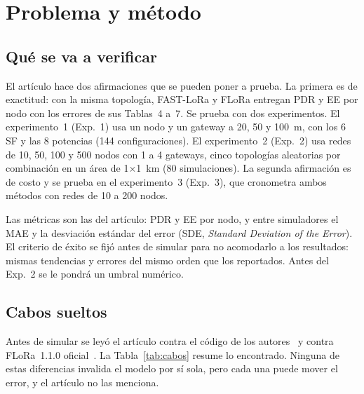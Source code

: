 \documentclass[conference,a4paper]{IEEEtran}
\begin{document}
\section{Problema y método}

\subsection{Qué se va a verificar}

El artículo hace dos afirmaciones que se pueden poner a prueba. La primera es de exactitud: con la misma topología, FAST-LoRa y FLoRa entregan PDR y EE por nodo con los errores de sus Tablas~4 a~7. Se prueba con dos experimentos. El experimento~1 (Exp.~1) usa un nodo y un gateway a 20, 50 y 100~m, con los 6 SF y las 8 potencias (144 configuraciones). El experimento~2 (Exp.~2) usa redes de 10, 50, 100 y 500 nodos con 1 a 4 gateways, cinco topologías aleatorias por combinación en un área de 1$\times$1~km (80 simulaciones). La segunda afirmación es de costo y se prueba en el experimento~3 (Exp.~3), que cronometra ambos métodos con redes de 10 a 200 nodos.

Las métricas son las del artículo: PDR y EE por nodo, y entre simuladores el MAE y la desviación estándar del error (SDE, \emph{Standard Deviation of the Error}). El criterio de éxito se fijó antes de simular para no acomodarlo a los resultados: mismas tendencias y errores del mismo orden que los reportados. Antes del Exp.~2 se le pondrá un umbral numérico.

\subsection{Cabos sueltos}
\label{sec:cabos}

Antes de simular se leyó el artículo contra el código de los autores~\cite{repofast,repomarltc} y contra FLoRa~1.1.0 oficial~\cite{repoflora}. La Tabla~\ref{tab:cabos} resume lo encontrado. Ninguna de estas diferencias invalida el modelo por sí sola, pero cada una puede mover el error, y el artículo no las menciona.
\end{document}

